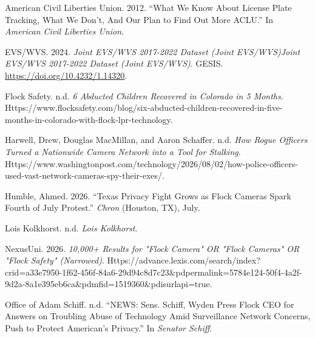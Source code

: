 \documentclass[
  american,
  12pt,
  letterpaper,
]{article}
\newlength{\cslhangindent}
\newenvironment{CSLReferences}[2] %
 {\begin{list}{}{%
  \setlength{\itemindent}{0pt}
  \setlength{\leftmargin}{0pt}
  \setlength{\parsep}{0pt}
  \ifodd #1
   \setlength{\leftmargin}{\cslhangindent}
   \setlength{\itemindent}{-1\cslhangindent}
  \fi
  \setlength{\itemsep}{#2\baselineskip}}}
 {\end{list}}
\renewenvironment{CSLReferences}[2]
  {\begin{list}{}{%
    \setlength{\itemindent}{0pt}%
    \setlength{\leftmargin}{0pt}%
    \setlength{\rightmargin}{0pt}%
    \setlength{\parsep}{0pt}%
    \setlength{\topsep}{0pt}%
    \setlength{\partopsep}{0pt}%
    \ifodd #1%
      \setlength{\leftmargin}{\cslhangindent}%
      \setlength{\itemindent}{-1\cslhangindent}%
    \fi%
    \setlength{\itemsep}{#2\baselineskip}%
  }}
  {\end{list}}
\begin{document}
\begin{singlespace}

\noindent{}\par


\vspace{2\baselineskip}

\protect{}\label{refs}
\begin{CSLReferences}{1}{1}
American Civil Liberties Union. 2012. {``What {We Know About License
Plate Tracking}, {What We Don}'t, {And Our Plan} to {Find Out More}
\textbar{} {ACLU}.''} In \emph{American Civil Liberties Union}.

EVS/WVS. 2024. \emph{Joint {EVS}/{WVS} 2017-2022 {Dataset} ({Joint
EVS}/{WVS}){Joint EVS}/{WVS} 2017-2022 {Dataset} ({Joint EVS}/{WVS})}.
GESIS. \url{https://doi.org/10.4232/1.14320}.

Flock Safety. n.d. \emph{6 {Abducted Children Recovered} in {Colorado}
in 5 {Months}}.
Https://www.flocksafety.com/blog/six-abducted-children-recovered-in-five-months-in-colorado-with-flock-lpr-technology.

Harwell, Drew, Douglas MacMillan, and Aaron Schaffer. n.d. \emph{How
Rogue Officers Turned a Nationwide Camera Network into a Tool for
Stalking}.
Https://www.washingtonpost.com/technology/2026/08/02/how-police-officers-used-vast-network-cameras-spy-their-exes/.

Humble, Ahmed. 2026. {``Texas Privacy Fight Grows as {Flock} Cameras
Spark {Fourth} of {July} Protest.''} \emph{Chron} (Houston, TX), July.

Lois Kolkhorst. n.d. \emph{Lois {Kolkhorst}}.

NexusUni. 2026. \emph{10,000+ Results for "{Flock} Camera" {OR} "{Flock}
Cameras" {OR} "{Flock Safety}" (Narrowed)}.
Https://advance.lexis.com/search/index?crid=a33e7950-1f62-456f-84a6-29d94c8d7c23\&pdpermalink=5784e124-50f4-4a2f-9d2a-8a1e395eb6ca\&pdmfid=1519360\&pdisurlapi=true.

Office of Adam Schiff. n.d. {``{NEWS}: {Sens}. {Schiff}, {Wyden Press
Flock CEO} for {Answers} on {Troubling Abuse} of {Technology Amid
Surveillance Network Concerns}, {Push} to {Protect American}'s
{Privacy}.''} In \emph{Senator Schiff}.


\end{CSLReferences}
\end{singlespace}
\end{document}
